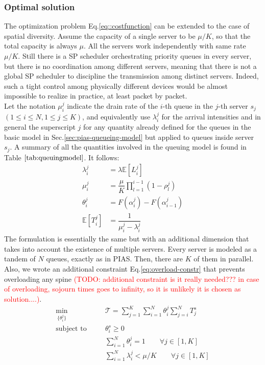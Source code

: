 \subsubsection{Optimal solution}
The optimization problem Eq.\eqref{eq::costfunction} can be extended to the case of spatial diversity.
Assume the capacity of a single server to be $\mu/K$, so that the total capacity is always $\mu$. All the servers work independently with same rate $\mu / K$. Still there is a SP scheduler orchestrating priority queues in every server, but there is no coordination among different servers, meaning that there is not a global SP scheduler to discipline the transmission among distinct servers. Indeed, such a tight control among physically different devices would be almost impossible to realize in practice, at least packet by packet. \\
Let the notation $\mu_i^j$ indicate the drain rate of the $i$-th queue in the $j$-th server $s_j$ $(1 \le i \le N, 1 \le j \le K)$, and equivalently use $\lambda_i^j$ for the arrival intensities and in general the superscript $j$ for any quantity already defined for the queues in the basic model in Sec.\ref{sec:pias-queueing-model} but applied to queues inside server $s_j$. A summary of all the quantities involved in the queuing model is found in Table $\ref{tab:queuingmodel}$. It follows:
\begin{align*}
\lambda_i^j &= \lambda \mathbb{E}[L_i^j] \\
\mu_i^j &=  \dfrac{\mu}{K} \prod_{l=1}^{i-1}(1-\rho_l^j) \\
\theta_i^j &= F(\alpha_i^j) - F(\alpha_{i-1}^j)	\\
\mathbb{E}[T_i^j] &= \dfrac{1}{\mu_i^j - \lambda_i^j}
\end{align*}
The formulation is essentially the same but with an additional dimension that takes into account the existence of multiple servers. Every server is modeled as a tandem of $N$ queues, exactly as in PIAS. Then, there are $K$ of them in parallel. Also, we wrote an additional constraint Eq.\eqref{eq:overload-constr} that prevents overloading any spine 
\textcolor{red}{(TODO: additional constraint is it really needed??? in case of overloading, sojourn times goes to infinity, so it is unlikely it is chosen as solution....)}. 
\begin{subequations}
	\begin{align}
	&\underset{\{\theta_i^j\}}{\text{min}} & \quad  & \mathcal{T} =	\sum_{j=1}^{K}\sum_{i=1}^{N} \theta_i^j \sum_{j=i}^{N}T^s_j 					\label{eq::costfunction-spatial} & \\
	&\text{subject to} & \quad  &\theta_i^s \ge 0 & \\
	& & & \sum_{i=1}^{N} \theta_i^j = 1  \qquad \forall j \in [1,K] &  \\
	& & & \sum_{i=1}^{N}  \lambda_i^j < \mu/K  \qquad \forall j \in [1,K] & \label{eq:overload-constr}
	\end{align}
	
\end{subequations}
